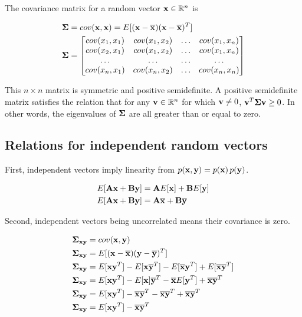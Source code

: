 The covariance matrix for a random vector $\mathbf{x} \in \mathbb{R}^n$ is

\begin{align*}
  \mathbf{\Sigma} &= cov(\mathbf{x}, \mathbf{x}) = E[(\mathbf{x} - \overline{\mathbf{x}})
    (\mathbf{x} - \overline{\mathbf{x}})^T] \\
  \mathbf{\Sigma} &= \begin{bmatrix}
    cov(x_1, x_1) & cov(x_1, x_2) & \ldots & cov(x_1, x_n) \\
    cov(x_2, x_1) & cov(x_1, x_2) & \ldots & cov(x_1, x_n) \\
    \ldots        & \ldots        & \ldots & \ldots \\
    cov(x_n, x_1) & cov(x_n, x_2) & \ldots & cov(x_n, x_n) \\
  \end{bmatrix}
\end{align*}

This $n \times n$ matrix is symmetric and positive semidefinite. A positive
semidefinite matrix satisfies the relation that for any
$\mathbf{v} \in \mathbb{R}^n$ for which $\mathbf{v} \neq 0$,
$\mathbf{v}^T \mathbf{\Sigma} \mathbf{v} \geq 0$. In other words, the eigenvalues of
$\mathbf{\Sigma}$ are all greater than or equal to zero.

\subsection{Relations for independent random vectors}

First, independent vectors imply linearity from
$p(\mathbf{x}, \mathbf{y}) = p(\mathbf{x}) \,p(\mathbf{y})$.

\begin{align*}
  E[\mathbf{A}\mathbf{x} + \mathbf{B}\mathbf{y}] &= \mathbf{A}E[\mathbf{x}] + \mathbf{B}E[\mathbf{y}] \\
  E[\mathbf{A}\mathbf{x} + \mathbf{B}\mathbf{y}] &= \mathbf{A}\overline{\mathbf{x}} + \mathbf{B}\overline{\mathbf{y}}
\end{align*}

Second, independent vectors being uncorrelated means their covariance is zero.

\begin{align}
  \mathbf{\Sigma}_{\mathbf{x}\mathbf{y}} &= cov(\mathbf{x}, \mathbf{y}) \nonumber \\
  \mathbf{\Sigma}_{\mathbf{x}\mathbf{y}} &= E[(\mathbf{x} - \overline{\mathbf{x}})
    (\mathbf{y} - \overline{\mathbf{y}})^T] \nonumber \\
  \mathbf{\Sigma}_{\mathbf{x}\mathbf{y}} &= E[\mathbf{x}\mathbf{y}^T] -
    E[\mathbf{x}\overline{\mathbf{y}}^T] - E[\overline{\mathbf{x}}\mathbf{y}^T] +
    E[\overline{\mathbf{x}}\overline{\mathbf{y}}^T] \nonumber \\
  \mathbf{\Sigma}_{\mathbf{x}\mathbf{y}} &= E[\mathbf{x}\mathbf{y}^T] -
    E[\mathbf{x}]\overline{\mathbf{y}}^T - \overline{\mathbf{x}}E[\mathbf{y}^T] +
    \overline{\mathbf{x}}\overline{\mathbf{y}}^T \nonumber \\
  \mathbf{\Sigma}_{\mathbf{x}\mathbf{y}} &= E[\mathbf{x}\mathbf{y}^T] -
    \overline{\mathbf{x}}\overline{\mathbf{y}}^T - \overline{\mathbf{x}}\overline{\mathbf{y}}^T +
    \overline{\mathbf{x}}\overline{\mathbf{y}}^T \nonumber \\
  \mathbf{\Sigma}_{\mathbf{x}\mathbf{y}} &= E[\mathbf{x}\mathbf{y}^T] -
    \overline{\mathbf{x}}\overline{\mathbf{y}}^T \label{eq:prb_sigma}
\end{align}

